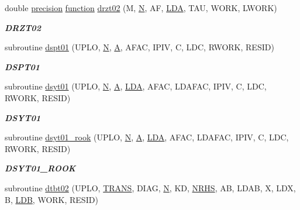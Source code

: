 \begin{DoxyCompactItemize}
double \hyperlink{numinquire_8h_a2c8e616467665d0b2814d4c1589ba74e}{precision} \hyperlink{afunc_8m_a7b5e596df91eadea6c537c0825e894a7}{function} \hyperlink{group__double__lin_ga5ae1a5a9a5e756a9172abf9df6048e5f}{drzt02} (M, \hyperlink{polmisc_8c_a0240ac851181b84ac374872dc5434ee4}{N}, A\+F, \hyperlink{example__user_8c_ae946da542ce0db94dced19b2ecefd1aa}{L\+D\+A}, T\+A\+U, W\+O\+R\+K, L\+W\+O\+R\+K)
\begin{DoxyCompactList}\small\item\em {\bfseries D\+R\+Z\+T02} \end{DoxyCompactList}\item 
subroutine \hyperlink{group__double__lin_ga508e28449eb6256ecfecab15751e327a}{dspt01} (U\+P\+L\+O, \hyperlink{polmisc_8c_a0240ac851181b84ac374872dc5434ee4}{N}, \hyperlink{classA}{A}, A\+F\+A\+C, I\+P\+I\+V, C, L\+D\+C, R\+W\+O\+R\+K, R\+E\+S\+I\+D)
\begin{DoxyCompactList}\small\item\em {\bfseries D\+S\+P\+T01} \end{DoxyCompactList}\item 
subroutine \hyperlink{group__double__lin_gae5935ffc21a0bcaf46bda6cc406368f6}{dsyt01} (U\+P\+L\+O, \hyperlink{polmisc_8c_a0240ac851181b84ac374872dc5434ee4}{N}, \hyperlink{classA}{A}, \hyperlink{example__user_8c_ae946da542ce0db94dced19b2ecefd1aa}{L\+D\+A}, A\+F\+A\+C, L\+D\+A\+F\+A\+C, I\+P\+I\+V, C, L\+D\+C, R\+W\+O\+R\+K, R\+E\+S\+I\+D)
\begin{DoxyCompactList}\small\item\em {\bfseries D\+S\+Y\+T01} \end{DoxyCompactList}\item 
subroutine \hyperlink{group__double__lin_ga2507f2787f18c8fbaa5dd348b265f6bf}{dsyt01\+\_\+rook} (U\+P\+L\+O, \hyperlink{polmisc_8c_a0240ac851181b84ac374872dc5434ee4}{N}, \hyperlink{classA}{A}, \hyperlink{example__user_8c_ae946da542ce0db94dced19b2ecefd1aa}{L\+D\+A}, A\+F\+A\+C, L\+D\+A\+F\+A\+C, I\+P\+I\+V, C, L\+D\+C, R\+W\+O\+R\+K, R\+E\+S\+I\+D)
\begin{DoxyCompactList}\small\item\em {\bfseries D\+S\+Y\+T01\+\_\+\+R\+O\+O\+K} \end{DoxyCompactList}\item 
subroutine \hyperlink{group__double__lin_ga68721b6208a7471e7bf14f9f120be485}{dtbt02} (U\+P\+L\+O, \hyperlink{superlu__enum__consts_8h_a0c4e17b2d5cea33f9991ccc6a6678d62a1f61e3015bfe0f0c2c3fda4c5a0cdf58}{T\+R\+A\+N\+S}, D\+I\+A\+G, \hyperlink{polmisc_8c_a0240ac851181b84ac374872dc5434ee4}{N}, K\+D, \hyperlink{example__user_8c_aa0138da002ce2a90360df2f521eb3198}{N\+R\+H\+S}, A\+B, L\+D\+A\+B, X, L\+D\+X, B, \hyperlink{example__user_8c_a50e90a7104df172b5a89a06c47fcca04}{L\+D\+B}, W\+O\+R\+K, R\+E\+S\+I\+D)

\end{DoxyCompactItemize}
